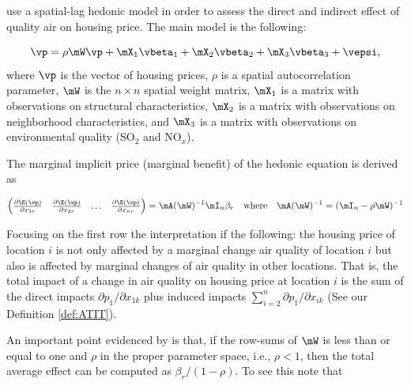 \documentclass[english,12pt]{book}\usepackage[]{graphicx}\usepackage[]{xcolor}
\begin{document}
\begin{example}\label{example:pollution-kim}
\cite{kim2003measuring} use a spatial-lag hedonic model in order to assess the direct and indirect effect of quality air on housing price.  The main model is the following:

\begin{equation*}
\vp = \rho\mW\vp + \mX_1\vbeta_1 + \mX_2\vbeta_2 + \mX_3\vbeta_3 + \vepsi,
\end{equation*}
%
where $\vp$ is the vector of housing prices, $\rho$ is a spatial autocorrelation parameter, $\mW$ is the $n\times n$ spatial weight matrix, $\mX_1$ is a matrix with observations on structural characteristics, $\mX_2$ is a matrix with observations on neighborhood characteristics, and $\mX_3$ is a matrix with observations on environmental quality (SO$_2$ and NO$_x$). 

The marginal implicit price (marginal benefit) of the hedonic equation is derived as

\begin{equation*}
\begin{pmatrix}
  \frac{\partial \E(\vp)}{\partial x_{1r}} & \frac{\partial \E(\vp)}{\partial x_{2r}} & \hdots & \frac{\partial \E(\vp)}{\partial x_{nr}} 
   \end{pmatrix} = \mA(\mW)^{-1}\mI_n\beta_r\quad \mbox{where}\quad \mA(\mW)^{-1} = (\mI_n - \rho\mW)^{-1}
\end{equation*}

Focusing on the first row the interpretation if the following: the housing price of location $i$ is not only affected by a marginal change air quality of location $i$ but also is affected by marginal changes of air quality in other locations. That is, the total impact of a change in air quality on housing price at location $i$ is the sum of the direct impacts $\partial p_1/\partial x_{1k}$ plus induced impacts $\sum_{i = 2}^n \partial p_1 / \partial x_{ik}$ (See our Definition \ref{def:ATIT}). 

An important point evidenced by \cite{kim2003measuring} is that, if  the row-sums of $\mW$ is less than or equal to one and $\rho$ in the proper parameter space, i.e., $\rho < 1$, then the total average effect can be computed as $\beta_r / (1-\rho)$. To see this note that


\end{example}
\end{document}
